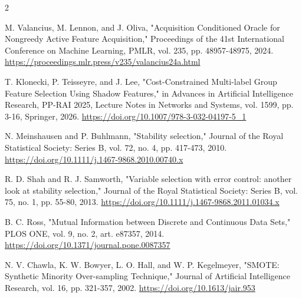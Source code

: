 \documentclass[10pt,a4paper]{article}
\begin{document}
\begin{multicols}{2}
\begin{minipage}{\linewidth}{\fontsize{7}{8.2}\selectfont [7] M. Valancius, M. Lennon, and J. Oliva, "Acquisition Conditioned Oracle for Nongreedy Active Feature Acquisition," Proceedings of the 41st International Conference on Machine Learning, PMLR, vol. 235, pp. 48957-48975, 2024. \url{https://proceedings.mlr.press/v235/valancius24a.html}\par}\end{minipage}\par
\begin{minipage}{\linewidth}{\fontsize{7}{8.2}\selectfont [8] T. Klonecki, P. Teisseyre, and J. Lee, "Cost-Constrained Multi-label Group Feature Selection Using Shadow Features," in Advances in Artificial Intelligence Research, PP-RAI 2025, Lecture Notes in Networks and Systems, vol. 1599, pp. 3-16, Springer, 2026. \url{https://doi.org/10.1007/978-3-032-04197-5_1}\par}\end{minipage}\par
\begin{minipage}{\linewidth}{\fontsize{7}{8.2}\selectfont [9] N. Meinshausen and P. Buhlmann, "Stability selection," Journal of the Royal Statistical Society: Series B, vol. 72, no. 4, pp. 417-473, 2010. \url{https://doi.org/10.1111/j.1467-9868.2010.00740.x}\par}\end{minipage}\par
\begin{minipage}{\linewidth}{\fontsize{7}{8.2}\selectfont [10] R. D. Shah and R. J. Samworth, "Variable selection with error control: another look at stability selection," Journal of the Royal Statistical Society: Series B, vol. 75, no. 1, pp. 55-80, 2013. \url{https://doi.org/10.1111/j.1467-9868.2011.01034.x}\par}\end{minipage}\par
\begin{minipage}{\linewidth}{\fontsize{7}{8.2}\selectfont [11] B. C. Ross, "Mutual Information between Discrete and Continuous Data Sets," PLOS ONE, vol. 9, no. 2, art. e87357, 2014. \url{https://doi.org/10.1371/journal.pone.0087357}\par}\end{minipage}\par
\begin{minipage}{\linewidth}{\fontsize{7}{8.2}\selectfont [12] N. V. Chawla, K. W. Bowyer, L. O. Hall, and W. P. Kegelmeyer, "SMOTE: Synthetic Minority Over-sampling Technique," Journal of Artificial Intelligence Research, vol. 16, pp. 321-357, 2002. \url{https://doi.org/10.1613/jair.953}\par}\end{minipage}\par

\end{multicols}
\end{document}
